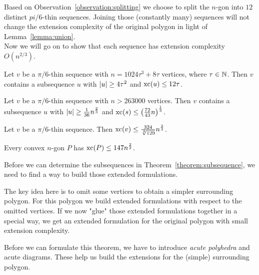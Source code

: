 Based on Observation~\ref{observation:splitting} we choose to split the $n$-gon into $12$ distinct $pi/6$-thin sequences. Joining those (constantly many) sequences will not change the extension complexity of the original polygon in light of Lemma~\ref{lemma:union}. \\
Now we will go on to show that each sequence has extension complexity $O(n^{2/3})$.

\begin{theorem}\label{theorem:subsequence}
  Let $v$ be a $\pi/6$-thin sequence with $n = 1024\tau^3 + 8\tau$ vertices, where $\tau \in \mathbb{N}$. 
  Then $v$ contains a subsequence $u$ with $\lvert u\rvert \geq 4\tau^2$ and $\operatorname{xc}(u) \leq 12\tau$.
\end{theorem}

\begin{corollary}\label{corollary:subsequence}
  Let $v$ be a $\pi/6$-thin sequence with $n > 263 000$ vertices. 
  Then $v$ contains a subsequence $u$ with $\lvert u\rvert \geq \frac{1}{36} n^{\frac{2}{3}}$ and $\operatorname{xc}(s) \leq \left( \frac{72}{43}n \right)^{\frac{1}{3}}$.
\end{corollary}

\begin{corollary}\label{corollary:thin-xc}
  Let $v$ be a $\pi/6$-thin sequence. Then $\operatorname{xc}(v) \leq \frac{324}{\sqrt[3]{129}} n^{\frac{2}{3}}$.
\end{corollary}

\begin{theorem}\label{theorem:xc}
  Every convex $n$-gon $P$ has $\operatorname{xc}(P) \leq 147 n^{\frac{2}{3}}$.
\end{theorem}


Before we can determine the subsequences in Theorem~\ref{theorem:subsequence}, we need to find a way to build those extended formulations.

The key idea here is to omit some vertices to obtain a simpler surrounding polygon. For this polygon we build extended formulations with respect to the omitted vertices. If we now "glue" those extended formulations together in a special way, we get an extended formulation for the original polygon with small extension complexity.

Before we can formulate this theorem, we have to introduce \emph{acute polyhedra} and acute diagrams. These help us build the extensions for the (simple) surrounding polygon.


